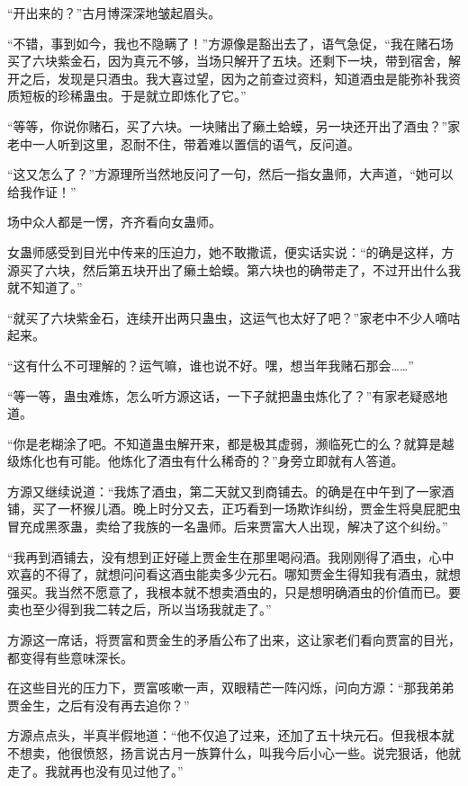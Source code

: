 
\begin{this_body}

“开出来的？”古月博深深地皱起眉头。

“不错，事到如今，我也不隐瞒了！”方源像是豁出去了，语气急促，“我在赌石场买了六块紫金石，因为真元不够，当场只解开了五块。还剩下一块，带到宿舍，解开之后，发现是只酒虫。我大喜过望，因为之前查过资料，知道酒虫是能弥补我资质短板的珍稀蛊虫。于是就立即炼化了它。”

“等等，你说你赌石，买了六块。一块赌出了癞土蛤蟆，另一块还开出了酒虫？”家老中一人听到这里，忍耐不住，带着难以置信的语气，反问道。

“这又怎么了？”方源理所当然地反问了一句，然后一指女蛊师，大声道，“她可以给我作证！”

场中众人都是一愣，齐齐看向女蛊师。

女蛊师感受到目光中传来的压迫力，她不敢撒谎，便实话实说：“的确是这样，方源买了六块，然后第五块开出了癞土蛤蟆。第六块也的确带走了，不过开出什么我就不知道了。”

“就买了六块紫金石，连续开出两只蛊虫，这运气也太好了吧？”家老中不少人嘀咕起来。

“这有什么不可理解的？运气嘛，谁也说不好。嘿，想当年我赌石那会……”

“等一等，蛊虫难炼，怎么听方源这话，一下子就把蛊虫炼化了？”有家老疑惑地道。

“你是老糊涂了吧。不知道蛊虫解开来，都是极其虚弱，濒临死亡的么？就算是越级炼化也有可能。他炼化了酒虫有什么稀奇的？”身旁立即就有人答道。

方源又继续说道：“我炼了酒虫，第二天就又到商铺去。的确是在中午到了一家酒铺，买了一杯猴儿酒。晚上时分又去，正巧看到一场欺诈纠纷，贾金生将臭屁肥虫冒充成黑豕蛊，卖给了我族的一名蛊师。后来贾富大人出现，解决了这个纠纷。”

“我再到酒铺去，没有想到正好碰上贾金生在那里喝闷酒。我刚刚得了酒虫，心中欢喜的不得了，就想问问看这酒虫能卖多少元石。哪知贾金生得知我有酒虫，就想强买。我当然不愿意了，我根本就不想卖酒虫的，只是想明确酒虫的价值而已。要卖也至少得到我二转之后，所以当场我就走了。”

方源这一席话，将贾富和贾金生的矛盾公布了出来，这让家老们看向贾富的目光，都变得有些意味深长。

在这些目光的压力下，贾富咳嗽一声，双眼精芒一阵闪烁，问向方源：“那我弟弟贾金生，之后有没有再去追你？”

方源点点头，半真半假地道：“他不仅追了过来，还加了五十块元石。但我根本就不想卖，他很愤怒，扬言说古月一族算什么，叫我今后小心一些。说完狠话，他就走了。我就再也没有见过他了。”


\end{this_body}

